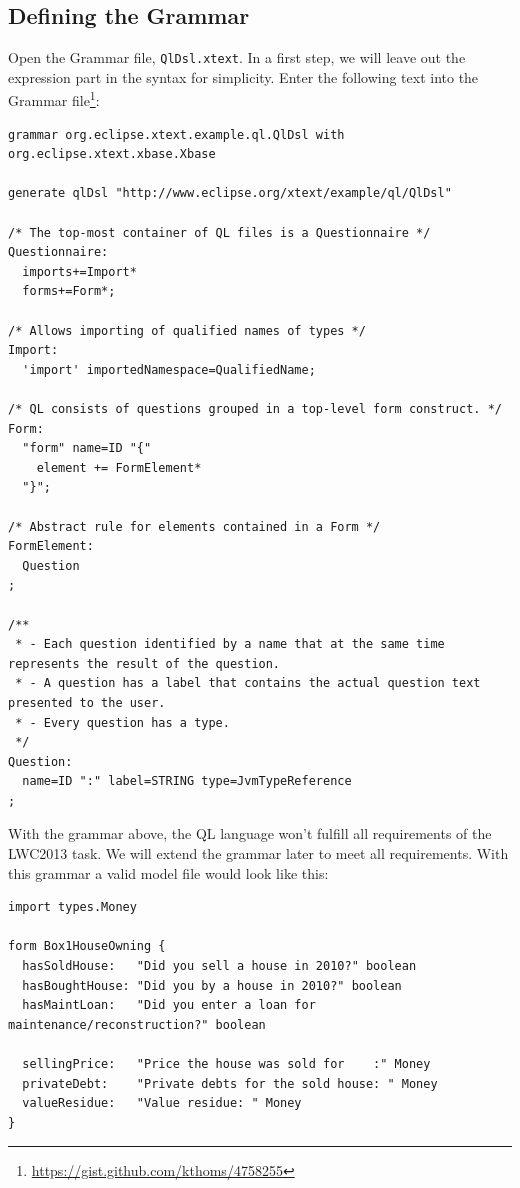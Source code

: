 \subsection{Defining the Grammar}

Open the Grammar file, \texttt{QlDsl.xtext}. In a first step, we will leave out
the expression part in the syntax for simplicity. Enter the following text into
the Grammar file\footnote{\url{https://gist.github.com/kthoms/4758255}}:

\begin{lstlisting}[language=Xtext]
grammar org.eclipse.xtext.example.ql.QlDsl with org.eclipse.xtext.xbase.Xbase

generate qlDsl "http://www.eclipse.org/xtext/example/ql/QlDsl"

/* The top-most container of QL files is a Questionnaire */
Questionnaire:
  imports+=Import*
  forms+=Form*;

/* Allows importing of qualified names of types */
Import:
  'import' importedNamespace=QualifiedName;

/* QL consists of questions grouped in a top-level form construct. */
Form:
  "form" name=ID "{"
    element += FormElement*
  "}";

/* Abstract rule for elements contained in a Form */
FormElement:
  Question
;

/**
 * - Each question identified by a name that at the same time represents the result of the question.
 * - A question has a label that contains the actual question text presented to the user.
 * - Every question has a type.
 */
Question:
  name=ID ":" label=STRING type=JvmTypeReference
;
\end{lstlisting}

With the grammar above, the QL language won't fulfill all requirements of the
LWC2013 task. We will extend the grammar later to meet all requirements. With
this grammar a valid model file would look like this:

\begin{lstlisting}[language=QL]
import types.Money

form Box1HouseOwning {
  hasSoldHouse:   "Did you sell a house in 2010?" boolean
  hasBoughtHouse: "Did you by a house in 2010?" boolean
  hasMaintLoan:   "Did you enter a loan for maintenance/reconstruction?" boolean
	
  sellingPrice:   "Price the house was sold for    :" Money 
  privateDebt:    "Private debts for the sold house: " Money
  valueResidue:   "Value residue: " Money 
}
\end{lstlisting}


